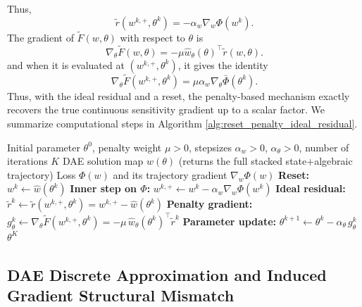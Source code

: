 Thus,
\begin{equation}
\tilde r(w^{k,+},\theta^k)
=
- \alpha_w \nabla_w \Phi(w^k).
\end{equation}
The gradient of $\tilde F(w,\theta)$ with respect to $\theta$ is
\begin{equation}
\nabla_\theta \tilde F(w,\theta)
=
-\mu \hat w_\theta(\theta)^\top \tilde r(w,\theta).
\end{equation}
and when it is evaluated at $(w^{k,+},\theta^k)$, it gives the  identity
\begin{equation}
\nabla_\theta \tilde F(w^{k,+},\theta^k)
=
\mu \alpha_w \nabla_\theta \bar\Phi(\theta^k).
\end{equation}
Thus, with the ideal residual and a reset, the penalty-based mechanism exactly
recovers the true continuous sensitivity gradient up to a scalar factor.
We summarize computational steps in Algorithm \ref{alg:reset_penalty_ideal_residual}.

\begin{algorithm}[t]
\caption{Reset-and-Penalty Gradient via Ideal Residual (DAE case)}
\label{alg:reset_penalty_ideal_residual}
\begin{algorithmic}[1]
\Require Initial parameter $\theta^{0}$, penalty weight $\mu>0$, stepsizes $\alpha_w>0$, $\alpha_\theta>0$, number of iterations $K$
\Require DAE solution map $\hat w(\theta)$ (returns the full stacked state+algebraic trajectory)
\Require Loss $\Phi(w)$ and its trajectory gradient $\nabla_w \Phi(w)$
    \State \textbf{Reset:} $w^{k} \gets \hat w(\theta^{k})$
    \State \textbf{Inner step on $\Phi$:} $w^{k,+} \gets w^{k} - \alpha_w \nabla_w \Phi(w^{k})$
    \State \textbf{Ideal residual:} $\tilde r^{k} \gets \tilde r(w^{k,+},\theta^{k}) = w^{k,+} - \hat w(\theta^{k})$
    \State \textbf{Penalty gradient:} $g_\theta^{k} \gets \nabla_\theta \tilde F(w^{k,+},\theta^{k})
    = -\mu\,\hat w_\theta(\theta^{k})^\top \tilde r^{k}$
    \State \textbf{Parameter update:} $\theta^{k+1} \gets \theta^{k} - \alpha_\theta\, g_\theta^{k}$
\EndFor
\State \Return $\theta^{K}$
\end{algorithmic}
\end{algorithm}

 \subsection{DAE Discrete Approximation and Induced Gradient Structural Mismatch}

